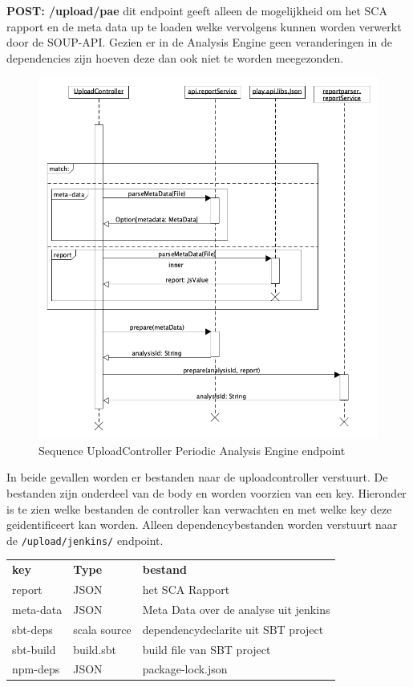 \textbf{POST: /upload/pae} dit endpoint geeft alleen de mogelijkheid om het SCA rapport en de meta data up te loaden welke vervolgens kunnen worden verwerkt door de SOUP-API. Gezien er in de Analysis Engine geen veranderingen in de dependencies zijn hoeven deze dan ook niet te worden meegezonden.

\begin{figure}[bth]
    \myfloatalign
    \includegraphics[width=12cm]{gfx/umlet/exports/SequploadController-pae}
    \caption{Sequence UploadController Periodic Analysis Engine endpoint}
    \label{fig:SequenceUploadReportpaet}
\end{figure}
In beide gevallen worden er bestanden naar de uploadcontroller verstuurt. De bestanden zijn onderdeel van de body en worden voorzien van een key. Hieronder is te zien welke bestanden de controller kan verwachten en met welke key deze geidentificeert kan worden. Alleen dependencybestanden worden verstuurt naar de \texttt{/upload/jenkins/} endpoint.

\begin{tabular}{lll}
    \textbf{key} & \textbf{Type} & \textbf{bestand} \\
    report & JSON & het SCA Rapport \\
    meta-data & JSON & Meta Data over de analyse uit jenkins \\
    sbt-deps & scala source & dependencydeclarite uit SBT project \\
    sbt-build & build.sbt  & build file van SBT project\\
    npm-deps & JSON & package-lock.json \\
\end{tabular} \\

